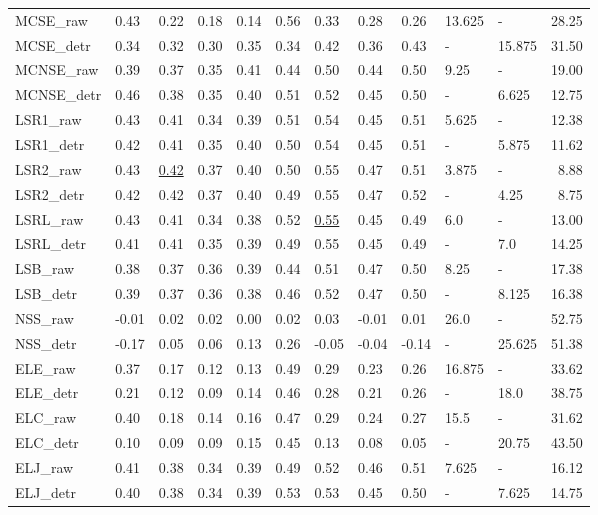 \begin{tabular}{lllllllllllr}
MCSE\_raw & 0.43 & 0.22 & 0.18 & 0.14 & 0.56 & 0.33 & 0.28 & 0.26 & 13.625 & - & 28.25 \\
MCSE\_detr & 0.34 & 0.32 & 0.30 & 0.35 & 0.34 & 0.42 & 0.36 & 0.43 & - & 15.875 & 31.50 \\
\midrule
MCNSE\_raw & 0.39 & 0.37 & 0.35 & 0.41 & 0.44 & 0.50 & 0.44 & 0.50 & 9.25 & - & 19.00 \\
MCNSE\_detr & 0.46 & 0.38 & 0.35 & 0.40 & 0.51 & 0.52 & 0.45 & 0.50 & - & 6.625 & 12.75 \\
\midrule
LSR1\_raw & 0.43 & 0.41 & 0.34 & 0.39 & 0.51 & 0.54 & 0.45 & 0.51 & 5.625 & - & 12.38 \\
LSR1\_detr & 0.42 & 0.41 & 0.35 & 0.40 & 0.50 & 0.54 & 0.45 & 0.51 & - & 5.875 & 11.62 \\
\midrule
LSR2\_raw & 0.43 & \underline{0.42} & 0.37 & 0.40 & 0.50 & 0.55 & 0.47 & 0.51 & 3.875 & - & 8.88 \\
LSR2\_detr & 0.42 & 0.42 & 0.37 & 0.40 & 0.49 & 0.55 & 0.47 & 0.52 & - & 4.25 & 8.75 \\
\midrule
LSRL\_raw & 0.43 & 0.41 & 0.34 & 0.38 & 0.52 & \underline{0.55} & 0.45 & 0.49 & 6.0 & - & 13.00 \\
LSRL\_detr & 0.41 & 0.41 & 0.35 & 0.39 & 0.49 & 0.55 & 0.45 & 0.49 & - & 7.0 & 14.25 \\
\midrule
LSB\_raw & 0.38 & 0.37 & 0.36 & 0.39 & 0.44 & 0.51 & 0.47 & 0.50 & 8.25 & - & 17.38 \\
LSB\_detr & 0.39 & 0.37 & 0.36 & 0.38 & 0.46 & 0.52 & 0.47 & 0.50 & - & 8.125 & 16.38 \\
\midrule
NSS\_raw & -0.01 & 0.02 & 0.02 & 0.00 & 0.02 & 0.03 & -0.01 & 0.01 & 26.0 & - & 52.75 \\
NSS\_detr & -0.17 & 0.05 & 0.06 & 0.13 & 0.26 & -0.05 & -0.04 & -0.14 & - & 25.625 & 51.38 \\
\midrule
ELE\_raw & 0.37 & 0.17 & 0.12 & 0.13 & 0.49 & 0.29 & 0.23 & 0.26 & 16.875 & - & 33.62 \\
ELE\_detr & 0.21 & 0.12 & 0.09 & 0.14 & 0.46 & 0.28 & 0.21 & 0.26 & - & 18.0 & 38.75 \\
\midrule
ELC\_raw & 0.40 & 0.18 & 0.14 & 0.16 & 0.47 & 0.29 & 0.24 & 0.27 & 15.5 & - & 31.62 \\
ELC\_detr & 0.10 & 0.09 & 0.09 & 0.15 & 0.45 & 0.13 & 0.08 & 0.05 & - & 20.75 & 43.50 \\
\midrule
ELJ\_raw & 0.41 & 0.38 & 0.34 & 0.39 & 0.49 & 0.52 & 0.46 & 0.51 & 7.625 & - & 16.12 \\
ELJ\_detr & 0.40 & 0.38 & 0.34 & 0.39 & 0.53 & 0.53 & 0.45 & 0.50 & - & 7.625 & 14.75 \\

\end{tabular}
